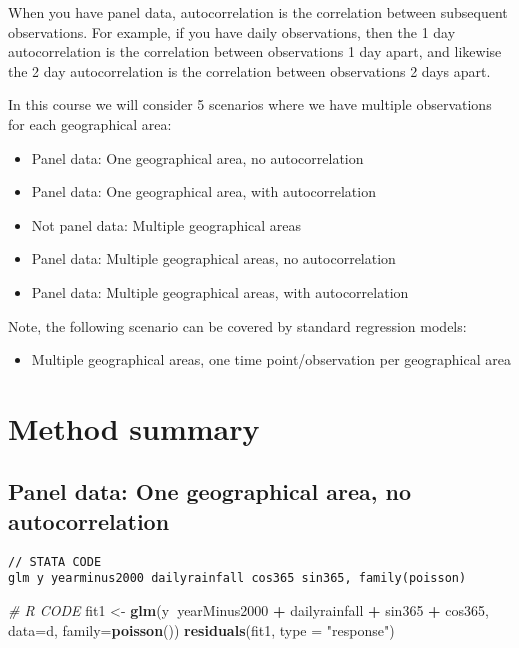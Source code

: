\documentclass[]{book}
\newenvironment{Shaded}{\begin{snugshade}}{\end{snugshade}}
\newcommand{\KeywordTok}[1]{\textcolor[rgb]{0.13,0.29,0.53}{\textbf{#1}}}
\newcommand{\DataTypeTok}[1]{\textcolor[rgb]{0.13,0.29,0.53}{#1}}
\newcommand{\StringTok}[1]{\textcolor[rgb]{0.31,0.60,0.02}{#1}}
\newcommand{\CommentTok}[1]{\textcolor[rgb]{0.56,0.35,0.01}{\textit{#1}}}
\newcommand{\OperatorTok}[1]{\textcolor[rgb]{0.81,0.36,0.00}{\textbf{#1}}}
\newcommand{\NormalTok}[1]{#1}
\providecommand{\tightlist}{%
  \setlength{\itemsep}{0pt}\setlength{\parskip}{0pt}}
\begin{document}
When you have panel data, autocorrelation is the correlation between
subsequent observations. For example, if you have daily observations,
then the 1 day autocorrelation is the correlation between observations 1
day apart, and likewise the 2 day autocorrelation is the correlation
between observations 2 days apart.

In this course we will consider 5 scenarios where we have multiple
observations for each geographical area:

\begin{itemize}
\tightlist
\item
  Panel data: One geographical area, no autocorrelation
\item
  Panel data: One geographical area, with autocorrelation
\item
  Not panel data: Multiple geographical areas
\item
  Panel data: Multiple geographical areas, no autocorrelation
\item
  Panel data: Multiple geographical areas, with autocorrelation
\end{itemize}

Note, the following scenario can be covered by standard regression
models:

\begin{itemize}
\tightlist
\item
  Multiple geographical areas, one time point/observation per
  geographical area
\end{itemize}

\newpage

\section{Method summary}\label{method-summary}

\subsection{Panel data: One geographical area, no
autocorrelation}\label{panel-data-one-geographical-area-no-autocorrelation}

\begin{verbatim}
// STATA CODE
glm y yearminus2000 dailyrainfall cos365 sin365, family(poisson)
\end{verbatim}

\begin{Shaded}
\begin{Highlighting}[]
\CommentTok{# R CODE}
\NormalTok{fit1 <-}\StringTok{ }\KeywordTok{glm}\NormalTok{(y}\OperatorTok{~}\NormalTok{yearMinus2000 }\OperatorTok{+}\StringTok{ }\NormalTok{dailyrainfall }\OperatorTok{+}\StringTok{ }\NormalTok{sin365 }\OperatorTok{+}\StringTok{ }\NormalTok{cos365, }\DataTypeTok{data=}\NormalTok{d, }\DataTypeTok{family=}\KeywordTok{poisson}\NormalTok{())}
\KeywordTok{residuals}\NormalTok{(fit1, }\DataTypeTok{type =} \StringTok{"response"}\NormalTok{)}
\end{Highlighting}
\end{Shaded}
\end{document}
